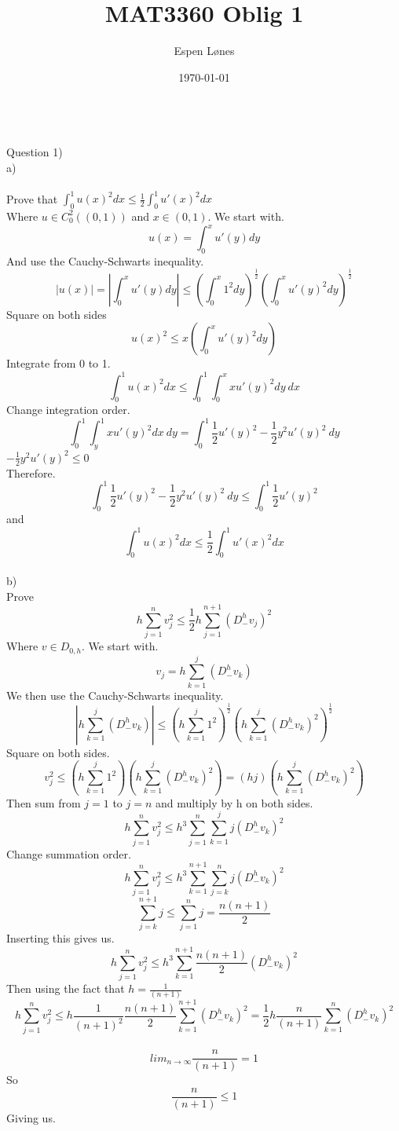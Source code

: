 \documentclass[12pt, letterpaper, twoside]{article}
\begin{document}
\title{MAT3360 Oblig 1}
\author{Espen Lønes}
\date{\today}
\maketitle
\ \\
Question 1)\\
a)\\
\ \\
Prove that
$\int_0^1 u(x)^2 dx \leq \frac{1}{2} \int_0^1 u'(x)^2 dx$\\
Where $u \in C_0^2((0,1))$ and $x \in (0,1)$. We start with.
$$
u(x) = \int_0^x u'(y) dy 
$$
And use the Cauchy-Schwarts inequality.
$$
|u(x)| = |\int_0^x u'(y) dy| \leq (\int_0^x 1^2 dy)^{\frac{1}{2}}(\int_0^x u'(y)^2 dy)^{\frac{1}{2}}
$$
Square on both sides
$$
u(x)^2 \leq x(\int_0^x u'(y)^2 dy)
$$
Integrate from 0 to 1.
$$
\int_0^1 u(x)^2 dx \leq \int_0^1 \int_0^x xu'(y)^2 dy\ dx
$$
Change integration order.
$$
\int_0^1 \int_y^1 xu'(y)^2 dx\ dy
=
\int_0^1 \frac{1}{2} u'(y)^2 - \frac{1}{2} y^2 u'(y)^2\ dy
$$ 
$
- \frac{1}{2} y^2 u'(y)^2 \leq 0 
$
\\
Therefore. 
$$
\int_0^1 \frac{1}{2} u'(y)^2 - \frac{1}{2} y^2 u'(y)^2\ dy
\leq
\int_0^1 \frac{1}{2} u'(y)^2
$$
and
$$
\int_0^1 u(x)^2 dx \leq \frac{1}{2} \int_0^1 u'(x)^2 dx
$$
\newpage
\ \\
b)\\
Prove
$$
h\sum_{j=1}^n v_j^2 \leq \frac{1}{2} h \sum_{j=1}^{n+1} (D_-^h v_j)^2
$$
Where $v \in D_{0,h}$. We start with.
$$
v_j = h\sum_{k=1}^j (D_-^h v_k)
$$
We then use the Cauchy-Schwarts inequality.
$$
|h\sum_{k=1}^j (D_-^h v_k)| \leq (h\sum_{k=1}^j 1^2)^{\frac{1}{2}}(h \sum_{k=1}^j (D_-^h v_k)^2)^{\frac{1}{2}}
$$
Square on both sides.
$$
v_j^2 \leq (h\sum_{k=1}^j 1^2)(h \sum_{k=1}^j (D_-^h v_k)^2)
=
(hj)(h \sum_{k=1}^j (D_-^h v_k)^2)
$$
Then sum from $j=1$ to $j=n$ and multiply by h on both sides.
$$
h\sum_{j=1}^n v_j^2 \leq h^3 \sum_{j=1}^n \sum_{k=1}^j j(D_-^h v_k)^2
$$
Change summation order.
$$
h\sum_{j=1}^n v_j^2 \leq h^3 \sum_{k=1}^{n+1} \sum_{j=k}^n j(D_-^h v_k)^2
$$
$$
\sum_{j=k}^{n+1} j \leq \sum_{j=1}^n j = \frac{n(n+1)}{2}
$$
Inserting this gives us.
$$
h\sum_{j=1}^n v_j^2 \leq h^3 \sum_{k=1}^{n+1} \frac{n(n+1)}{2} (D_-^h v_k)^2
$$
Then using the fact that $h=\frac{1}{(n+1)}$
$$
h\sum_{j=1}^n v_j^2 \leq h \frac{1}{(n+1)^2} \frac{n(n+1)}{2} \sum_{k=1}^{n+1} (D_-^h v_k)^2
=
\frac{1}{2} h \frac{n}{(n+1)} \sum_{k=1}^n (D_-^h v_k)^2
$$
\newpage
\ \\
$$
lim_{n \to \infty} \frac{n}{(n+1)} = 1
$$ 
So
$$
\frac{n}{(n+1)} \leq 1
$$
Giving us.
\end{document}
